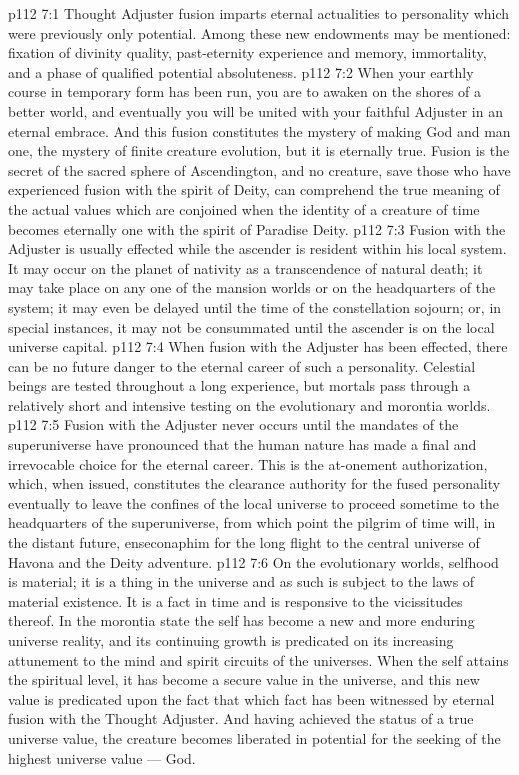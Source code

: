 \vs p112 7:1 Thought Adjuster fusion imparts eternal actualities to personality which were previously only potential. Among these new endowments may be mentioned: fixation of divinity quality, past\hyp{}eternity experience and memory, immortality, and a phase of qualified potential absoluteness.
\vs p112 7:2 \pc When your earthly course in temporary form has been run, you are to awaken on the shores of a better world, and eventually you will be united with your faithful Adjuster in an eternal embrace. And this fusion constitutes the mystery of making God and man one, the mystery of finite creature evolution, but it is eternally true. Fusion is the secret of the sacred sphere of Ascendington, and no creature, save those who have experienced fusion with the spirit of Deity, can comprehend the true meaning of the actual values which are conjoined when the identity of a creature of time becomes eternally one with the spirit of Paradise Deity.
\vs p112 7:3 Fusion with the Adjuster is usually effected while the ascender is resident within his local system. It may occur on the planet of nativity as a transcendence of natural death; it may take place on any one of the mansion worlds or on the headquarters of the system; it may even be delayed until the time of the constellation sojourn; or, in special instances, it may not be consummated until the ascender is on the local universe capital.
\vs p112 7:4 When fusion with the Adjuster has been effected, there can be no future danger to the eternal career of such a personality. Celestial beings are tested throughout a long experience, but mortals pass through a relatively short and intensive testing on the evolutionary and morontia worlds.
\vs p112 7:5 Fusion with the Adjuster never occurs until the mandates of the superuniverse have pronounced that the human nature has made a final and irrevocable choice for the eternal career. This is the at\hyp{}onement authorization, which, when issued, constitutes the clearance authority for the fused personality eventually to leave the confines of the local universe to proceed sometime to the headquarters of the superuniverse, from which point the pilgrim of time will, in the distant future, enseconaphim for the long flight to the central universe of Havona and the Deity adventure.
\vs p112 7:6 \pc On the evolutionary worlds, selfhood is material; it is a thing in the universe and as such is subject to the laws of material existence. It is a fact in time and is responsive to the vicissitudes thereof.  In the morontia state the self has become a new and more enduring universe reality, and its continuing growth is predicated on its increasing attunement to the mind and spirit circuits of the universes.  When the self attains the spiritual level, it has become a secure value in the universe, and this new value is predicated upon the fact that  which fact has been witnessed by eternal fusion with the Thought Adjuster. And having achieved the status of a true universe value, the creature becomes liberated in potential for the seeking of the highest universe value --- God.
